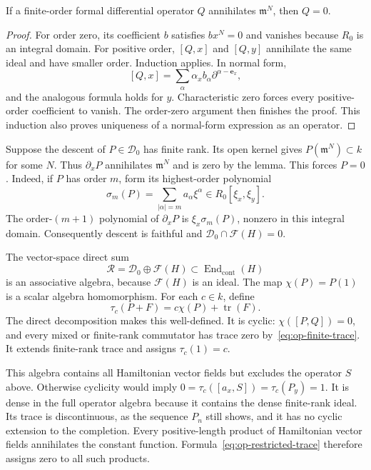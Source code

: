 \begin{lemma}
If a finite-order formal differential operator $Q$ annihilates
$\mathfrak m^N$, then $Q=0$.
\end{lemma}
\begin{proof}
For order zero, its coefficient $b$ satisfies $bx^N=0$ and vanishes
because $R_0$ is an integral domain. For positive order, $[Q,x]$ and
$[Q,y]$ annihilate the same ideal and have smaller order. Induction applies.
In normal form,
\[
 [Q,x]=\sum_\alpha\alpha_xb_\alpha
                   \partial^{\alpha-\mathbf e_x},
\]
and the analogous formula holds for $y$. Characteristic zero forces
every positive-order coefficient to vanish. The order-zero argument
then finishes the proof. This induction also proves uniqueness of a
normal-form expression as an operator.
\end{proof}

Suppose the descent of $P\in\mathcal D_0$ has finite rank. Its open
kernel gives $P(\mathfrak m^N)\subset k$ for some $N$. Thus
$\partial_xP$ annihilates $\mathfrak m^N$ and is zero by the lemma.
This forces $P=0$. Indeed, if $P$ has order $m$, form its highest-order
polynomial
\[
 \sigma_m(P)=\sum_{|\alpha|=m}a_\alpha\xi^\alpha
             \in R_0[\xi_x,\xi_y].
\]
The order-$(m+1)$ polynomial of $\partial_xP$ is
$\xi_x\sigma_m(P)$, nonzero in this integral domain.
Consequently descent is faithful and
$\mathcal D_0\cap\mathcal F(H)=0$.

The vector-space direct sum
\[
 \mathcal R=\mathcal D_0\oplus\mathcal F(H)
         \subset\operatorname{End}_{\mathrm{cont}}(H)
\]
is an associative algebra, because $\mathcal F(H)$ is an ideal.
The map $\chi(P)=P(1)$ is a scalar algebra homomorphism. For each $c\in k$,
define
\begin{equation}
 \tau_c(P+F)=c\chi(P)+\operatorname{tr}(F).
 \label{eq:op-restricted-trace}
\end{equation}
The direct decomposition makes this well-defined. It is cyclic:
$\chi([P,Q])=0$, and every mixed or finite-rank commutator has trace
zero by~\eqref{eq:op-finite-trace}. It extends finite-rank trace and
assigns $\tau_c(1)=c$.

This algebra contains all Hamiltonian vector fields but excludes the
operator $S$ above. Otherwise cyclicity would imply
$0=\tau_c([a_x,S])=\tau_c(P_y)=1$.
It is dense in the full operator algebra because it contains the dense
finite-rank ideal. Its trace is discontinuous, as the sequence $P_n$
still shows, and it has no cyclic extension to the completion.
Every positive-length product of Hamiltonian vector fields annihilates
the constant function. Formula~\eqref{eq:op-restricted-trace} therefore
assigns zero to all such products.

